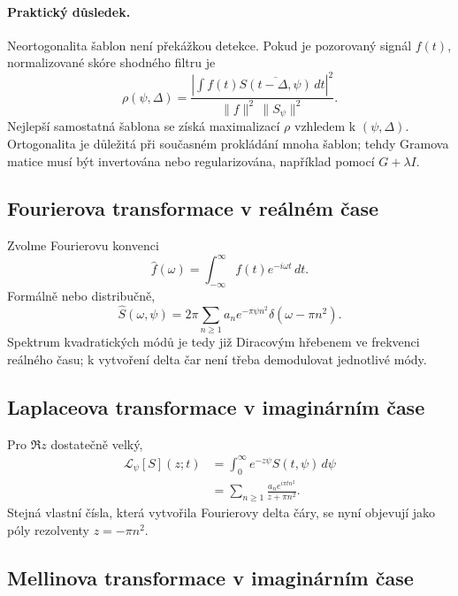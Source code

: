 \paragraph{Praktický důsledek.}
Neortogonalita šablon není překážkou detekce.  Pokud je pozorovaný signál
$f(t)$, normalizované skóre shodného filtru je
\begin{equation}
  \rho(\psi,\Delta)
  =\frac{\left|\int f(t)\overline{S(t-\Delta,\psi)}\,dt\right|^2}
  {\|f\|^2\,\|S_\psi\|^2}.
  \label{eq:theta-matched-filter}
\end{equation}
Nejlepší samostatná šablona se získá maximalizací $\rho$ vzhledem k $(\psi,\Delta)$.
Ortogonalita je důležitá při současném prokládání mnoha šablon; tehdy
Gramova matice musí být invertována nebo regularizována, například pomocí $G+\lambda I$.

\subsection{Fourierova transformace v reálném čase}

Zvolme Fourierovu konvenci
\begin{equation}
  \widehat f(\omega)=\int_{-\infty}^{\infty}f(t)e^{-i\omega t}\,dt.
\end{equation}
Formálně nebo distribučně,
\begin{equation}
  \widehat S(\omega,\psi)
  =2\pi\sum_{n\ge1}a_n e^{-\pi\psi n^2}
       \delta(\omega-\pi n^2).
  \label{eq:fourier-delta-spectrum}
\end{equation}
Spektrum kvadratických módů je tedy již Diracovým hřebenem ve frekvenci
reálného času; k vytvoření delta čar není třeba demodulovat jednotlivé módy.

\subsection{Laplaceova transformace v imaginárním čase}

Pro $\Re z$ dostatečně velký,
\begin{align}
  \mathcal L_\psi[S](z;t)
   &=\int_0^\infty e^{-z\psi}S(t,\psi)\,d\psi \\
   &=\sum_{n\ge1}
      \frac{a_n e^{i\pi t n^2}}{z+\pi n^2}.
  \label{eq:laplace-resolvent}
\end{align}
Stejná vlastní čísla, která vytvořila Fourierovy delta čáry, se nyní objevují jako póly rezolventy
$z=-\pi n^2$.

\subsection{Mellinova transformace v imaginárním čase}


